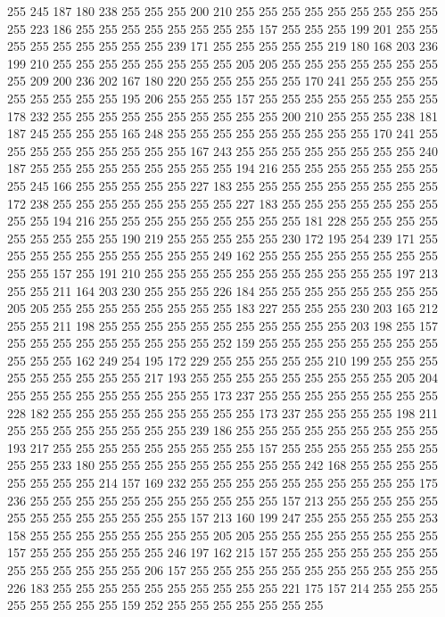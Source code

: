255 245 187 180 238 255 255 255 200 210 255 255 255 255 255 255 255 255 255 255
223 186 255 255 255 255 255 255 255 255 157 255 255 255 199 201 255 255 255 255
255 255 255 255 255 239 171 255 255 255 255 255 219 180 168 203 236 199 210 255
255 255 255 255 255 255 255 205 205 255 255 255 255 255 255 255 255 209 200 236
202 167 180 220 255 255 255 255 255 170 241 255 255 255 255 255 255 255 255 255
195 206 255 255 255 157 255 255 255 255 255 255 255 255 178 232 255 255 255 255
255 255 255 255 255 255 200 210 255 255 255 238 181 187 245 255 255 255 165 248
255 255 255 255 255 255 255 255 255 170 241 255 255 255 255 255 255 255 255 255
167 243 255 255 255 255 255 255 255 255 240 187 255 255 255 255 255 255 255 255
255 194 216 255 255 255 255 255 255 255 255 245 166 255 255 255 255 255 227 183
255 255 255 255 255 255 255 255 255 172 238 255 255 255 255 255 255 255 255 227
183 255 255 255 255 255 255 255 255 255 194 216 255 255 255 255 255 255 255 255
255 181 228 255 255 255 255 255 255 255 255 255 190 219 255 255 255 255 255 230
172 195 254 239 171 255 255 255 255 255 255 255 255 255 255 249 162 255 255 255
255 255 255 255 255 255 255 157 255 191 210 255 255 255 255 255 255 255 255 255
255 255 197 213 255 255 211 164 203 230 255 255 255 226 184 255 255 255 255 255
255 255 255 205 205 255 255 255 255 255 255 255 255 183 227 255 255 255 230 203
165 212 255 255 211 198 255 255 255 255 255 255 255 255 255 255 255 203 198 255
157 255 255 255 255 255 255 255 255 255 252 159 255 255 255 255 255 255 255 255
255 255 255 162 249 254 195 172 229 255 255 255 255 255 210 199 255 255 255 255
255 255 255 255 255 217 193 255 255 255 255 255 255 255 255 255 205 204 255 255
255 255 255 255 255 255 255 173 237 255 255 255 255 255 255 255 255 228 182 255
255 255 255 255 255 255 255 255 173 237 255 255 255 255 198 211 255 255 255 255
255 255 255 255 239 186 255 255 255 255 255 255 255 255 255 193 217 255 255 255
255 255 255 255 255 255 157 255 255 255 255 255 255 255 255 255 233 180 255 255
255 255 255 255 255 255 255 242 168 255 255 255 255 255 255 255 255 214 157 169
232 255 255 255 255 255 255 255 255 255 255 175 236 255 255 255 255 255 255 255
255 255 255 255 157 213 255 255 255 255 255 255 255 255 255 255 255 255 255 157
213 160 199 247 255 255 255 255 255 253 158 255 255 255 255 255 255 255 255 205
205 255 255 255 255 255 255 255 255 157 255 255 255 255 255 255 246 197 162 215
157 255 255 255 255 255 255 255 255 255 255 255 255 255 206 157 255 255 255 255
255 255 255 255 255 255 255 226 183 255 255 255 255 255 255 255 255 255 255 221
175 157 214 255 255 255 255 255 255 255 255 159 252 255 255 255 255 255 255 255
